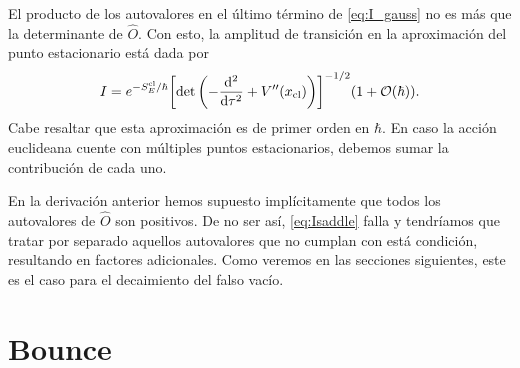El producto de los autovalores en el último término de \eqref{eq:I_gauss} no es más que la determinante de $\hat{O}$. Con esto, %
la amplitud de transición en la aproximación del punto estacionario está dada por
\begin{equation}\label{eq:Isaddle}
I = e^{-S_E^{\textrm{cl}} / \hbar} \qty[ \det\left(-\dv[2]{\tau} + V''\qty(x_{\textrm{cl}}) \right) ]^{-1/2} \qty(1 + \order{\hbar}).
\end{equation}
Cabe resaltar que esta aproximación es de primer orden en $\hbar$. En caso la acción euclideana cuente con múltiples puntos estacionarios, debemos sumar la contribución de cada uno.


En la derivación anterior hemos supuesto implícitamente que todos los autovalores de $\hat{O}$ son positivos. De no ser así, \eqref{eq:Isaddle} falla y tendríamos que tratar por separado aquellos autovalores que no cumplan con está condición, resultando en factores adicionales. %
Como veremos en las secciones siguientes, este es el caso para el decaimiento del falso vacío.

\section{Bounce}


 

